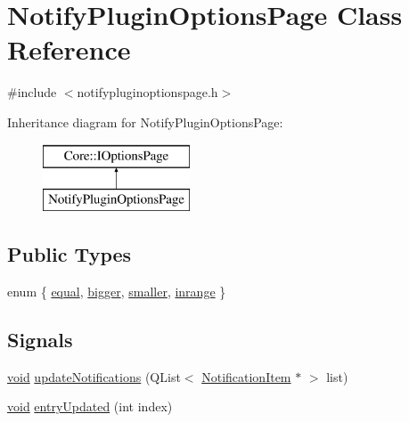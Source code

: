 \hypertarget{class_notify_plugin_options_page}{\section{\-Notify\-Plugin\-Options\-Page \-Class \-Reference}
\label{class_notify_plugin_options_page}
}


{\ttfamily \#include $<$notifypluginoptionspage.\-h$>$}

\-Inheritance diagram for \-Notify\-Plugin\-Options\-Page\-:\begin{figure}[H]
\begin{center}
\leavevmode
\includegraphics[height=2.000000cm]{class_notify_plugin_options_page}
\end{center}
\end{figure}
\subsection*{\-Public \-Types}
\begin{DoxyCompactItemize}
\item 
enum \{ \hyperlink{group___notify_plugin_gga9c834973912acf834d3b1329c908d391a5215660515a642089b68f6e4fb7ebb77}{equal}, 
\hyperlink{group___notify_plugin_gga9c834973912acf834d3b1329c908d391a0645a6aff2f8f76e753f1eaf08fd4cb0}{bigger}, 
\hyperlink{group___notify_plugin_gga9c834973912acf834d3b1329c908d391a3bd98b14a252e90591e9f7b8c70c995b}{smaller}, 
\hyperlink{group___notify_plugin_gga9c834973912acf834d3b1329c908d391a4cd2df3d72786caddbe5e90598da981a}{inrange}
 \}
\end{DoxyCompactItemize}
\subsection*{\-Signals}
\begin{DoxyCompactItemize}
\item 
\hyperlink{group___u_a_v_objects_plugin_ga444cf2ff3f0ecbe028adce838d373f5c}{void} \hyperlink{group___notify_plugin_gadbd273176d3047b997383d3791fcf3aa}{update\-Notifications} (\-Q\-List$<$ \hyperlink{class_notification_item}{\-Notification\-Item} $\ast$ $>$ list)
\item 
\hyperlink{group___u_a_v_objects_plugin_ga444cf2ff3f0ecbe028adce838d373f5c}{void} \hyperlink{group___notify_plugin_gacfc979fcc446bc951c04ba8741231190}{entry\-Updated} (int index)
\end{DoxyCompactItemize}
